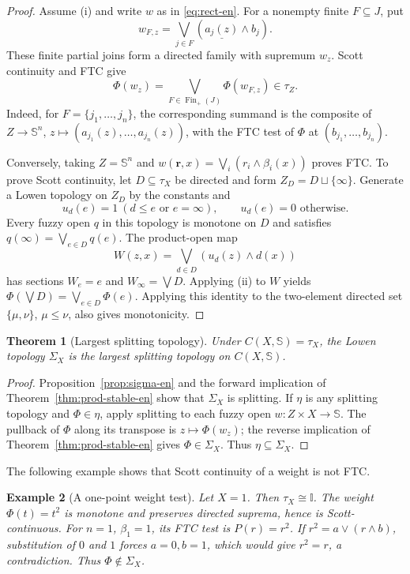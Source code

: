 \documentclass[10pt,a4paper]{amsart}
\numberwithin{equation}{section}
\newtheorem{theorem}{Theorem}[section]
\newtheorem{example}[theorem]{Example}
\newcommand{\I}{\mathbb I}
\newcommand{\Sier}{\mathbb S}
\newcommand{\const}[1]{\underline{#1}}
\newcommand{\Fin}{\operatorname{Fin}}
\begin{document}
\begin{proof}
Assume (i) and write \(w\) as in \eqref{eq:rect-en}.  For a nonempty
finite \(F\subseteq J\), put
\[
 w_{F,z}=\bigvee_{j\in F}
       (\const{a_j(z)}\wedge b_j).
\]
These finite partial joins form a directed family with supremum \(w_z\).
Scott continuity and FTC give
\[
 \Phi(w_z)=\bigvee_{F\in\Fin_+(J)}\Phi(w_{F,z})\in\tau_Z.
\]
Indeed, for \(F=\{j_1,\ldots,j_n\}\), the corresponding summand is the
composite of \(Z\to\Sier^n\),
\(z\mapsto(a_{j_1}(z),\ldots,a_{j_n}(z))\), with the FTC test of
\(\Phi\) at \((b_{j_1},\ldots,b_{j_n})\).

Conversely, taking \(Z=\Sier^n\) and
\(w(\boldsymbol r,x)=\bigvee_i(r_i\wedge\beta_i(x))\) proves FTC.  To
prove Scott continuity, let \(D\subseteq\tau_X\) be directed and form
\(Z_D=D\sqcup\{\infty\}\).  Generate a Lowen topology on \(Z_D\) by
the constants and
\[
 u_d(e)=1\ (d\leq e\text{ or }e=\infty),
 \qquad u_d(e)=0\text{ otherwise}.
\]
Every fuzzy open \(q\) in this topology is monotone on \(D\) and
satisfies \(q(\infty)=\bigvee_{e\in D}q(e)\).  The product-open map
\[
 W(z,x)=\bigvee_{d\in D}(u_d(z)\wedge d(x))
\]
has sections \(W_e=e\) and \(W_\infty=\bigvee D\).  Applying (ii) to
\(W\) yields
\(\Phi(\bigvee D)=\bigvee_{e\in D}\Phi(e)\).  Applying this identity to
the two-element directed set \(\{\mu,\nu\}\), \(\mu\leq\nu\), also
gives monotonicity.
\end{proof}

\begin{theorem}[Largest splitting topology]\label{thm:max-split-en}
Under \(C(X,\Sier)=\tau_X\), the Lowen topology \(\Sigma_X\) is the
largest splitting topology on \(C(X,\Sier)\).
\end{theorem}

\begin{proof}
Proposition~\ref{prop:sigma-en} and the forward implication of
Theorem~\ref{thm:prod-stable-en} show that \(\Sigma_X\) is splitting.
If \(\eta\) is any splitting topology and \(\Phi\in\eta\), apply
splitting to each fuzzy open \(w:Z\times X\to\Sier\).  The pullback of
\(\Phi\) along its transpose is \(z\mapsto\Phi(w_z)\); the reverse
implication of Theorem~\ref{thm:prod-stable-en} gives
\(\Phi\in\Sigma_X\).  Thus \(\eta\subseteq\Sigma_X\).
\end{proof}

The following example shows that Scott continuity of a weight is not FTC.

\begin{example}[A one-point weight test]
Let \(X=1\).  Then \(\tau_X\cong\I\).  The weight
\(\Phi(t)=t^2\) is monotone and preserves directed suprema, hence is
Scott-continuous.  For \(n=1\), \(\beta_1=1\), its FTC test is
\(P(r)=r^2\).  If \(r^2=a\vee(r\wedge b)\), substitution of \(0\) and
\(1\) forces \(a=0,b=1\), which would give \(r^2=r\), a contradiction.
Thus \(\Phi\notin\Sigma_X\).
\end{example}
\end{document}
